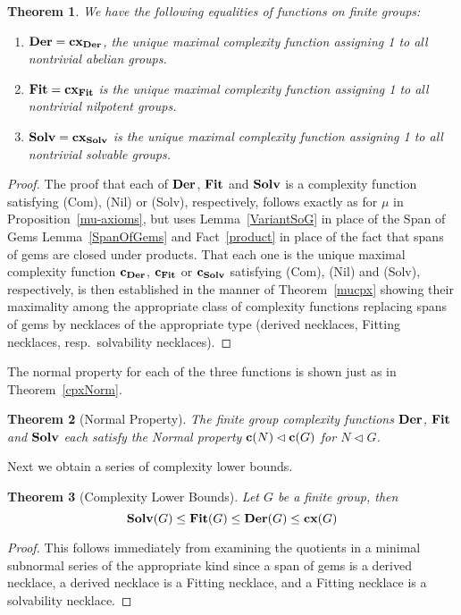 \documentclass[a4paper,11pt]{amsart}
\newtheorem{theorem}{Theorem}[section]
\theoremstyle{definition}
\newcommand{\cx}{\mbox{\bf cx}}
\renewcommand{\c}{\mbox{\bf c}}
\newcommand{\Fit}{{\bf Fit}}
\newcommand{\Der}{{\bf Der}}
\newcommand{\Solv}{{\bf Solv}}
\newcommand{\1}{{\mathbf 1}}
\begin{document}
\begin{theorem} \label{charCpxFunctions}
We have the following equalities of functions on finite groups: 
\begin{enumerate} 
    \item  $\Der=\cx_\Der$, the unique maximal complexity function assigning 1 to all nontrivial abelian groups. 
  \item $\Fit=\cx_\Fit$ is the unique maximal complexity function assigning 1 to all nontrivial nilpotent groups. 
 \item   $\Solv=\cx_\Solv$ is the unique maximal complexity function assigning 1 to all nontrivial solvable groups.
       \end{enumerate}
\end{theorem}
\begin{proof}
The proof that each of $\Der$, $\Fit$ and $\Solv$ is a complexity function satisfying (Com), (Nil) or (Solv), respectively, follows exactly as for $\mu$ in Proposition~\ref{mu-axioms}, but uses Lemma~\ref{VariantSoG} in place of the Span of Gems Lemma~\ref{SpanOfGems} and Fact~\ref{product} in place of the fact that spans of gems are closed under products. That each one is the unique maximal complexity function $\c_\Der$, $\c_\Fit$ or $\c_\Solv$ satisfying (Com),
(Nil) and (Solv), respectively, is then established in the manner of Theorem~\ref{mucpx} showing their maximality among the appropriate class of complexity functions replacing spans of gems by necklaces of the appropriate type (derived necklaces, Fitting necklaces, resp.\ solvability necklaces). 
\end{proof}

The normal property for each of the three functions is shown just as in Theorem~\ref{cpxNorm}. 
\begin{theorem}[Normal Property]
The finite group complexity functions $\Der$, $\Fit$ and $\Solv$ 
each satisfy the Normal property $\c(N) \lhd \c(G)$ for  $N \lhd G$.
\end{theorem}

Next we obtain a series of complexity lower bounds. 

\begin{theorem}[Complexity Lower Bounds]\label{lowerbounds}
Let $G$ be a finite group, then
$$\Solv(G) \leq \Fit(G) \leq \Der(G) \leq \cx(G)$$
\end{theorem}
\begin{proof} This follows immediately from examining the quotients in a minimal subnormal series of the appropriate kind since a span of gems is a derived necklace, a derived necklace is a Fitting necklace, and a Fitting necklace is a solvability necklace.   \end{proof}
\end{document}
